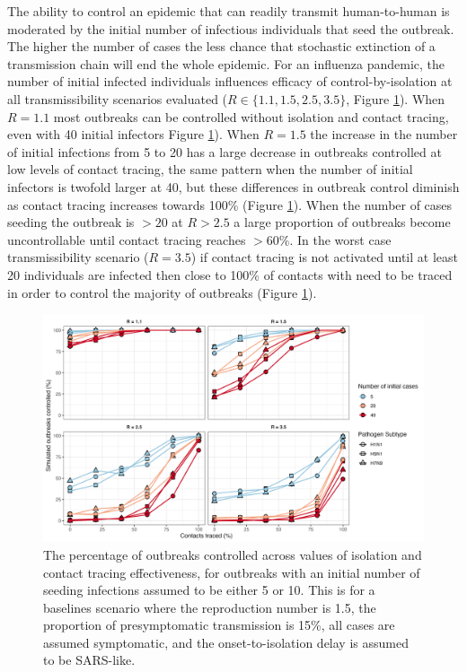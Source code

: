\documentclass{article}
\begin{document}
\clearpage

The ability to control an epidemic that can readily transmit human-to-human is moderated by the initial number of infectious individuals that seed the outbreak. The higher the number of cases the less chance that stochastic extinction of a transmission chain will end the whole epidemic. For an influenza pandemic, the number of initial infected individuals influences efficacy of control-by-isolation at all transmissibility scenarios evaluated ($R \in \{1.1, 1.5, 2.5, 3.5\}$, Figure \ref{fig:prop-outbreak-control-num-init-cases}). When $R = 1.1$ most outbreaks can be controlled without isolation and contact tracing, even with 40 initial infectors Figure \ref{fig:prop-outbreak-control-num-init-cases}). When $R = 1.5$ the increase in the number of initial infections from 5 to 20 has a large decrease in outbreaks controlled at low levels of contact tracing, the same pattern when the number of initial infectors is twofold larger at 40, but these differences in outbreak control diminish as contact tracing increases towards 100\% (Figure \ref{fig:prop-outbreak-control-num-init-cases}). When the number of cases seeding the outbreak is $>20$ at $R>2.5$ a large proportion of outbreaks become uncontrollable until contact tracing reaches $>60\%$. In the worst case transmissibility scenario ($R = 3.5$) if contact tracing is not activated until at least 20 individuals are infected then close to 100\% of contacts with need to be traced in order to control the majority of outbreaks (Figure \ref{fig:prop-outbreak-control-num-init-cases}).  \\

\begin{figure}[ht]
\centering
\includegraphics[width=\textwidth]{../plots/prop_outbreak_control_num_init_cases.png}
\caption{The percentage of outbreaks controlled across values of isolation and contact tracing effectiveness, for outbreaks with an initial number of seeding infections assumed to be either 5 or 10. This is for a baselines scenario where the reproduction number is 1.5, the proportion of presymptomatic transmission is 15\%, all cases are assumed symptomatic, and the onset-to-isolation delay is assumed to be SARS-like.}
\label{fig:prop-outbreak-control-num-init-cases}
\end{figure}
\end{document}
